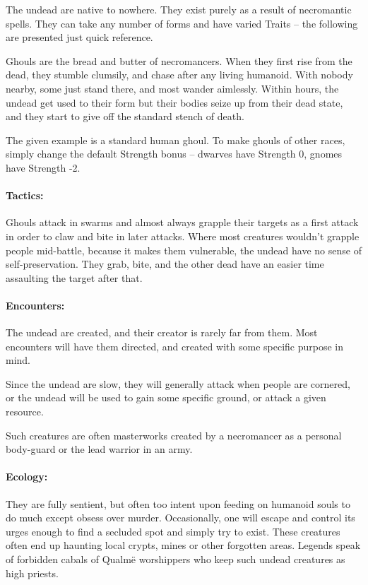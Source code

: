 \begin{multicols}{2}

The undead are native to nowhere.
They exist purely as a result of necromantic spells.
They can take any number of forms and have varied Traits -- the following are presented just quick reference.

\label{ghoul}

Ghouls are the bread and butter of necromancers.
When they first rise from the dead, they stumble clumsily, and chase after any living humanoid.
With nobody nearby, some just stand there, and most wander aimlessly.
Within hours, the undead get used to their form but their bodies seize up from their dead state, and they start to give off the standard stench of death.

The given example is a standard human ghoul.
To make ghouls of other races, simply change the default Strength bonus -- dwarves have Strength 0, gnomes have Strength -2.

\paragraph{Tactics:}
Ghouls attack in swarms and almost always grapple their targets as a first attack in order to claw and bite in later attacks.
Where most creatures wouldn't grapple people mid-battle, because it makes them vulnerable, the undead have no sense of self-preservation.
They grab, bite, and the other dead have an easier time assaulting the target after that.

\paragraph{Encounters:}
The undead are created, and their creator is rarely far from them.
Most encounters will have them directed, and created with some specific purpose in mind.

Since the undead are slow, they will generally attack when people are cornered, or the undead will be used to gain some specific ground, or attack a given resource.

\label{ghast}


Such creatures are often masterworks created by a necromancer as a personal body-guard or the lead warrior in an army.


\paragraph{Ecology:} They are fully sentient, but often too intent upon feeding on humanoid souls to do much except obsess over murder.
Occasionally, one will escape and control its urges enough to find a secluded spot and simply try to exist.
These creatures often end up haunting local crypts, mines or other forgotten areas.
Legends speak of forbidden cabals of Qualm\"{e} worshippers who keep such undead creatures as high priests.


\end{multicols}
